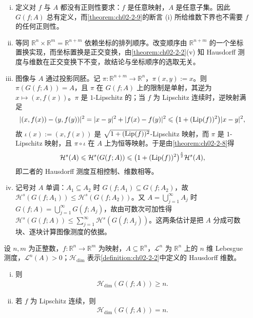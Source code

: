 \documentclass[../../main.tex]{subfiles}%
\begin{document}
\begin{remark}\label{remark:ch02-def-2-5-条件}
\begin{enumerate}[(i)]
\item 定义对 $f$ 与 $A$ 都没有正则性要求：$f$ 是任意映射，$A$ 是任意子集。因此 $G(f;A)$ 总有定义，而\cref{theorem:ch02-2-9}的断言 (i) 所给维数下界也不需要 $f$ 的任何正则性。%
\item 等同 $\mathbb{R}^n\times\mathbb{R}^m=\mathbb{R}^{n+m}$ 依赖坐标的排列顺序。改变顺序由 $\mathbb{R}^{n+m}$ 的一个坐标置换实现，而坐标置换是正交变换，由\cref{theorem:ch02-2-2}(v) 知 Hausdorff 测度与维数在正交变换下不变，故结论与坐标顺序的选取无关。%
\item 图像与 $A$ 通过投影同胚。记 $\pi:\mathbb{R}^{n+m}\to\mathbb{R}^n$，$\pi(x,y):=x$。则 $\pi(G(f;A))=A$，且 $\pi$ 在 $G(f;A)$ 上的限制是单射，其逆为 $x\mapsto(x,f(x))$。$\pi$ 是 $1$-Lipschitz 的；当 $f$ 为 Lipschitz 连续时，逆映射满足
\begin{align*}
\lvert(x,f(x))-(y,f(y))\rvert^2=\lvert x-y\rvert^2+\lvert f(x)-f(y)\rvert^2\leqslant\bigl(1+(\operatorname{Lip}(f))^2\bigr)\lvert x-y\rvert^2 ,
\end{align*}
故 $\iota(x):=(x,f(x))$ 是 $\sqrt{1+(\operatorname{Lip}(f))^2}$-Lipschitz 映射，而 $\pi$ 是 $1$-Lipschitz 映射，且 $\pi\circ\iota$ 在 $A$ 上为恒等映射。于是由\cref{theorem:ch02-2-8}得%
\begin{align*}
\mathcal{H}^s(A)\leqslant\mathcal{H}^s(G(f;A))\leqslant\bigl(1+(\operatorname{Lip}(f))^2\bigr)^{\frac{s}{2}}\mathcal{H}^s(A),
\end{align*}
即二者的 Hausdorff 测度互相控制、维数相等。
\item 记号对 $A$ 单调：$A_1\subseteq A_2$ 时 $G(f;A_1)\subseteq G(f;A_2)$，故 $\mathcal{H}^s(G(f;A_1))\leqslant\mathcal{H}^s(G(f;A_2))$。又 $A=\bigcup_{j=1}^{\infty}A_j$ 时 $G(f;A)=\bigcup_{j=1}^{\infty}G(f;A_j)$，故由可数次可加性得 $\mathcal{H}^s(G(f;A))\leqslant\sum_{j=1}^{\infty}\mathcal{H}^s(G(f;A_j))$。这两条估计是把 $A$ 分成可数块、逐块计算图像测度的依据。
\end{enumerate}
\end{remark}

\begin{theorem}\label{theorem:ch02-2-9}
设 $n,m$ 为正整数，$f:\mathbb{R}^n\to\mathbb{R}^m$ 为映射，$A\subseteq\mathbb{R}^n$，$\mathcal{L}^n$ 为 $\mathbb{R}^n$ 上的 $n$ 维 Lebesgue 测度，$\mathcal{L}^n(A)>0$；$\mathcal{H}_{\dim}$ 表示\cref{definition:ch02-2-2}中定义的 Hausdorff 维数。%
\begin{enumerate}[(i)]
\item 则
\begin{align*}
\mathcal{H}_{\dim}(G(f;A))\geqslant n .
\end{align*}
\item 若 $f$ 为 Lipschitz 连续，则
\begin{align*}
\mathcal{H}_{\dim}(G(f;A))=n .
\end{align*}
\end{enumerate}
\end{theorem}
\end{document}
